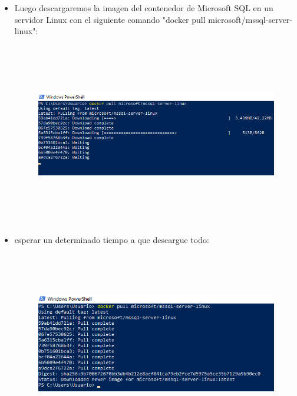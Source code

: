 \begin{itemize}
	\item Luego descargaremos la imagen del contenedor de Microsoft SQL en un servidor Linux con el siguiente comando "docker pull microsoft/mssql-server-linux":\\
	
	
	\begin{figure}[htb]
	\begin{center}
	\includegraphics[width=16cm, height=8cm]{./Imagenes/dockerdownload}
	\end{center}
	\end{figure}
	
	\item esperar un determinado tiempo a que descargue todo:\\
	
	
	\begin{figure}[htb]
	\begin{center}
	\includegraphics[width=16cm, height=8cm]{./Imagenes/dockerdownloaded}
	\end{center}
	\end{figure}
	\clearpage
	

\end{itemize}
